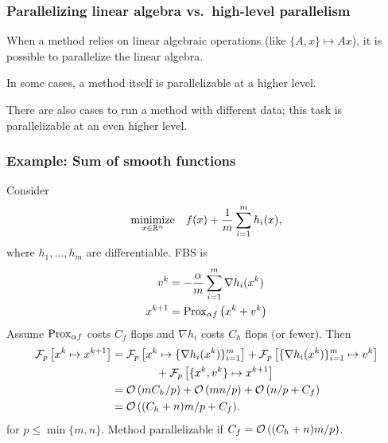 \documentclass[10pt,mathserif]{beamer}
\begin{document}
\begin{frame}
\frametitle{Parallelizing linear algebra vs.\ high-level parallelism}
When a method relies on linear algebraic operations (like $\{A,x\}\mapsto Ax$), it is possible to parallelize the linear algebra.

\vspace{0.2in}\pause

In some cases,  a method itself is parallelizable at a higher level.

\vspace{0.2in}\pause

There are also cases to run a method with different data; this task is parallelizable at an even higher level.

%
\end{frame}


\begin{frame}[plain]
\frametitle{Example: Sum of smooth functions}
Consider 
\[
\begin{array}{ll}
\underset{x\in \mathbb{R}^n}{\mbox{minimize}}&
\displaystyle{f(x) + \frac{1}{m}\sum_{i=1}^{m}h_i(x),}
\end{array}
\]
where $h_1,\dots,h_m$ are differentiable. \pause FBS is
\begin{align*}
  v^k & = -  \frac{\alpha}{m}\sum\itom \nabla h_i(x^k)\\%
  x^{k+1} & = \prox_{\alpha f}\left(x^k + v^k\right)%
\end{align*}
\pause
Assume $\mathrm{Prox}_{\alpha f}$ costs $C_f$ flops and $\nabla h_i$ costs $C_h$ flops (or fewer).
Then
\begin{align*}
\mathcal{F}_p\left[x^k\mapsto x^{k+1}\right]
&=
\mathcal{F}_p\left[x^k\mapsto\{\nabla h_i(x^k)\}\itom  \right]+
\mathcal{F}_p\left[\{\nabla h_i(x^k)\}\itom \mapsto v^k \right]\\
&\qquad\qquad+
\mathcal{F}_p\left[\{x^k,v^k \}\mapsto x^{k+1}\right]\\
&=\order{mC_h/p} + \order{mn/p } + \order{n/p+C_f}\\
&=\order{(C_h + n)m/p+ C_f}.%
\end{align*}
 for $p\le \min\{m,n\}$.
Method parallelizable if $C_f={\mathcal{O}\left((C_h + n)m/p\right)}$.
\end{frame}
\end{document}
